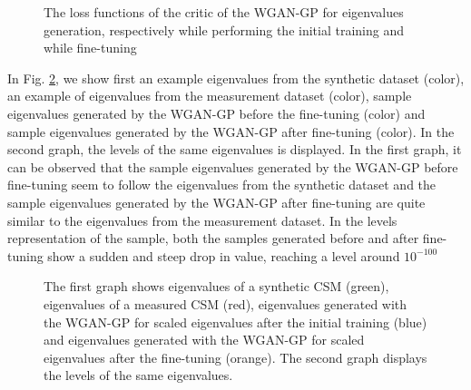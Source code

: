 \documentclass[11pt,a4paper,twoside]{report}
\begin{document}
\begin{figure}
    \centering
    \caption{The loss functions of the critic of the WGAN-GP for eigenvalues generation, respectively while performing the initial training and while fine-tuning}
    \label{fig:loss_evals_wgangp}
\end{figure}

In Fig. \ref{fig:samples_evals_wgangp}, we show first an example eigenvalues from the synthetic dataset (color), an example of eigenvalues from the measurement dataset (color), sample eigenvalues generated by the WGAN-GP before the fine-tuning (color) and sample eigenvalues generated by the WGAN-GP after fine-tuning (color). In the second graph, the levels of the same eigenvalues is displayed. In the first graph, it can be observed that the sample eigenvalues generated by the WGAN-GP before fine-tuning seem to follow the eigenvalues from the synthetic dataset and the sample eigenvalues generated by the WGAN-GP after fine-tuning are quite similar to the eigenvalues from the measurement dataset. In the levels representation of the sample, both the samples generated before and after fine-tuning show a sudden and steep drop in value, reaching a level around $10^{-100}$

\begin{figure}
    \centering
    \caption{The first graph shows eigenvalues of a synthetic CSM (green), eigenvalues of a measured CSM (red), eigenvalues generated with the WGAN-GP for scaled eigenvalues after the initial training (blue) and eigenvalues generated with the WGAN-GP for scaled eigenvalues after the fine-tuning (orange). The second graph displays the levels of the same eigenvalues.}
    \label{fig:samples_evals_wgangp}
\end{figure}
\end{document}

